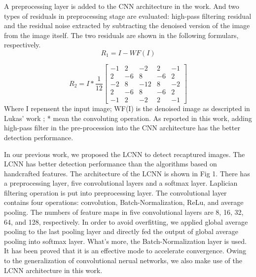 \documentclass{article}
\begin{document}
A preprocessing layer is added to the CNN architecture in the work\cite{19}. And two types of residuals in preprocessing stage are evaluated: high-pass filtering residual and the residual noise extracted by subtracting the denoised version of the image from the image itself. The two residuals are shown in the following formulars, respectively.
\begin{equation}\label{key}
R_{1}=I-WF(I)
\end{equation}

\begin{equation}\label{key}
R_{2}=I*\dfrac{1}{12}
\begin{bmatrix}
-1 & 2 & -2 & 2 & -1 \\ 2 & -6 & 8 & -6 & 2 \\-2 & 8 & -12 & 8 & -2 \\2 & -6 & 8 & -6 & 2 \\-1 & 2 & -2 & 2 & -1
\end{bmatrix}
\end{equation}
Where I repensent the input image; WF(I) is the denoised image as descripted in Lukas' work \cite{20}; * mean the convoluting operation. As reported in this work, adding high-pass filter in the pre-procession into the CNN architecture has the better detection performance.

In our previous work\cite{17}, we proposed the LCNN to detect recaptured images. The LCNN has better detection performance than the algorithms based on handcrafted features. The architecture of the LCNN is shown in Fig 1. There has a preprocessing layer, five convolutional layers and a softmax layer. Laplician filtering operation is put into preprocessing layer. The convolutional layer contains four operations: convolution, Batch-Normalization, ReLu, and average pooling. The numbers of feature maps in five convolutional layers are 8, 16, 32, 64, and 128, respectively. In order to avoid overfitting, we applied  global average pooling to the last pooling layer and directly fed the output of global average pooling into softmax layer. What's more, the Batch-Normalization layer is used. It has been proved that it is an effective mode to accelerate convergence. Owing to the generalization of convolutional nerual networks, we also make use of the LCNN architecture in this work.
\end{document}
